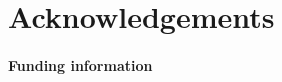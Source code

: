 \documentclass[submission, Phys]{SciPost}
\begin{document}
\section*{Acknowledgements}


\paragraph{Funding information}




% 
% 




% 


\nolinenumbers
\end{document}

